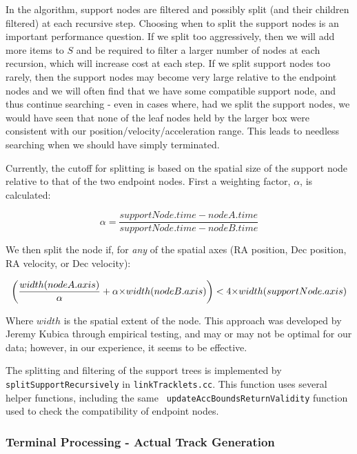 In the algorithm, support nodes are filtered and possibly split (and
their children filtered) at each recursive step.  Choosing when to
split the support nodes is an important performance question.  If we
split too aggressively, then we will add more items to $S$ and be
required to filter a larger number of nodes at each recursion, which
will increase cost at each step.  If we split support nodes too
rarely, then the support nodes may become very large relative to the
endpoint nodes and we will often find that we have some compatible
support node, and thus continue searching - even in cases where, had
we split the support nodes, we would have seen that none of the leaf
nodes held by the larger box were consistent with our
position/velocity/acceleration range.  This leads to needless
searching when we should have simply terminated.

Currently, the cutoff for splitting is based on the spatial size of
the support node relative to that of the two endpoint nodes.  First
a weighting factor, $\alpha$, is calculated:

\begin{equation}
\alpha = \frac{supportNode.time - nodeA.time}{supportNode.time - nodeB.time}
\end{equation}

We then split the node if, for \textit{any} of the spatial axes (RA position, Dec position, RA velocity, or Dec velocity):

\begin{equation}
\bigg(\frac{width(nodeA.axis)}{\alpha} + \alpha \hbox{$\times$} width(nodeB.axis)\bigg) < 4 \hbox{$\times$} width(supportNode.axis)
\end{equation}

Where $width$ is the spatial extent of the node.  This approach was
developed by Jeremy Kubica through empirical testing, and may or may
not be optimal for our data; however, in our experience, it seems to
be effective.

The splitting and filtering of the support trees is implemented by
{\tt splitSupportRecursively} in {\tt linkTracklets.cc}.  This
function uses several helper functions, including the same {\tt
  updateAccBoundsReturnValidity} function used to check the
compatibility of endpoint nodes.


\subsubsection{Terminal Processing - Actual Track Generation}

